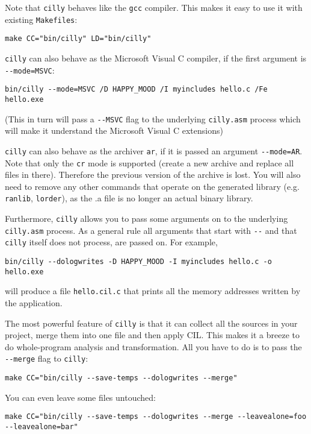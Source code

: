 \documentclass[letterpaper]{article}
\def\t#1{{\tt #1}}
\begin{document}
 Note that \t{cilly} behaves like the \t{gcc} compiler. This makes it
easy to use it with existing \t{Makefiles}:
\begin{verbatim}
make CC="bin/cilly" LD="bin/cilly"
\end{verbatim}

 \t{cilly} can also behave as the Microsoft Visual C compiler, if the first
 argument is \t{-{}-mode=MSVC}:
\begin{verbatim}
bin/cilly --mode=MSVC /D HAPPY_MOOD /I myincludes hello.c /Fe hello.exe
\end{verbatim}

 (This in turn will pass a \t{-{}-MSVC} flag to the underlying \t{cilly.asm}
 process which will make it understand the Microsoft Visual C extensions)

 \t{cilly} can also behave as the archiver \t{ar}, if it is passed an
 argument \t{-{}-mode=AR}. Note that only the \t{cr} mode is supported
 (create a new archive and replace all files in there).  Therefore the
 previous version of the archive is lost. You will also need to remove
 any other commands that operate on the generated library
 (e.g. \t{ranlib}, \t{lorder}), as the .a file is no longer an actual
 binary library.

 Furthermore, \t{cilly} allows you to pass some arguments on to the
underlying \t{cilly.asm} process. As a general rule all arguments that start
with \t{-{}-} and that \t{cilly} itself does not process, are passed on. For
example, 
\begin{verbatim}
bin/cilly --dologwrites -D HAPPY_MOOD -I myincludes hello.c -o hello.exe
\end{verbatim}

 will produce a file \t{hello.cil.c} that prints all the memory addresses
written by the application. 

 The most powerful feature of \t{cilly} is that it can collect all the
sources in your project, merge them into one file and then apply CIL. This
makes it a breeze to do whole-program analysis and transformation. All you
have to do is to pass the \t{-{}-merge} flag to \t{cilly}:
\begin{verbatim}
make CC="bin/cilly --save-temps --dologwrites --merge"
\end{verbatim}

 You can even leave some files untouched:
\begin{verbatim}
make CC="bin/cilly --save-temps --dologwrites --merge --leavealone=foo --leavealone=bar"
\end{verbatim}
\end{document}
